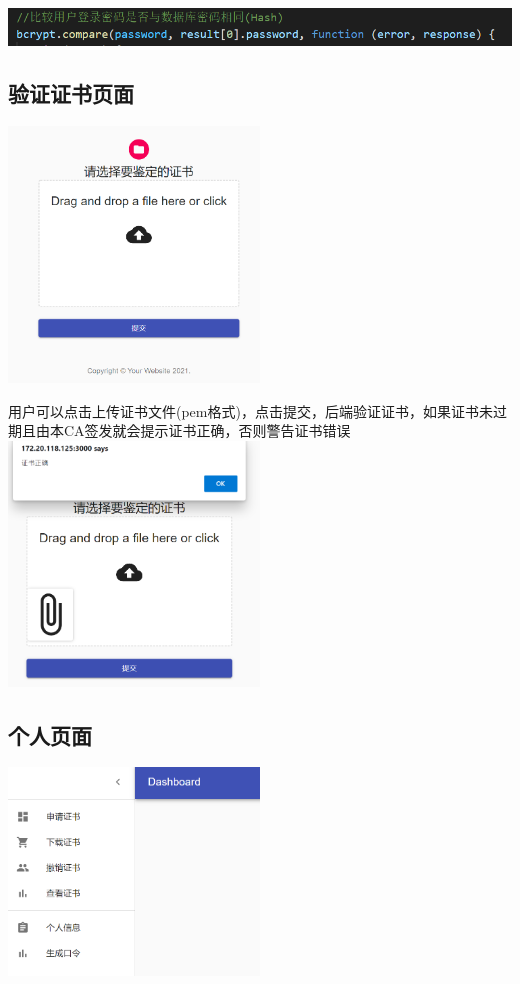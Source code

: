 \documentclass{ctexart}
\begin{document}
\includegraphics[width=\textwidth]{Clipboard_2021-01-01-11-00-35.png}

\subsection{验证证书页面}

\includegraphics[width=0.5\textwidth]{Clipboard_2021-01-01-11-09-06.png}

用户可以点击上传证书文件(pem格式)，点击提交，后端验证证书，如果证书未过期且由本CA签发就会提示证书正确，否则警告证书错误\\


\includegraphics[width=0.5\textwidth]{Clipboard_2021-01-01-11-15-06.png}


\subsection{个人页面}

\includegraphics[width=0.5\textwidth]{Clipboard_2021-01-01-11-18-23.png}
\end{document}
